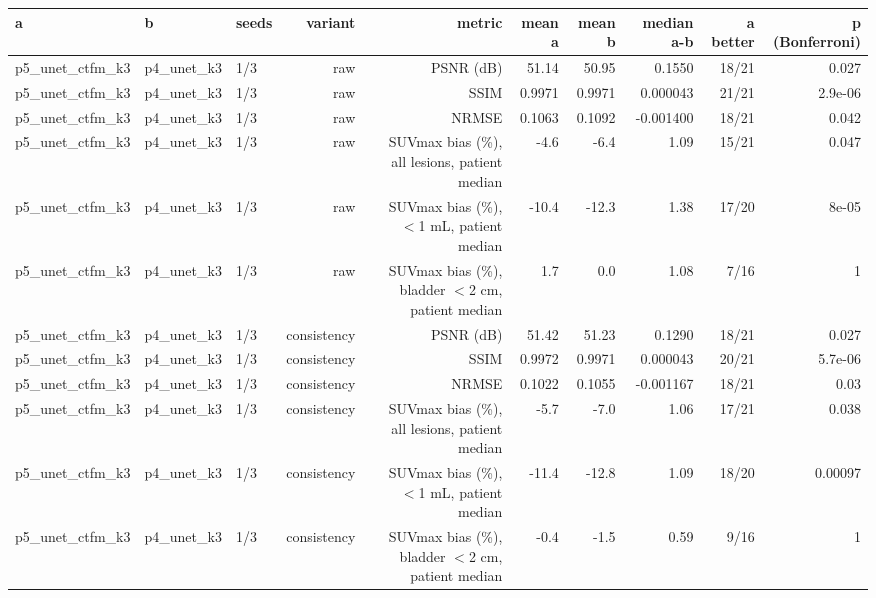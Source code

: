 \begin{tabular}{lllrrrrrrr}
\toprule
a & b & seeds & variant & metric & mean a & mean b & median a-b & a better & p (Bonferroni) \\
\midrule
p5\_unet\_ctfm\_k3 & p4\_unet\_k3 & 1/3 & raw & PSNR (dB) & 51.14 & 50.95 & 0.1550 & 18/21 & 0.027 \\
p5\_unet\_ctfm\_k3 & p4\_unet\_k3 & 1/3 & raw & SSIM & 0.9971 & 0.9971 & 0.000043 & 21/21 & 2.9e-06 \\
p5\_unet\_ctfm\_k3 & p4\_unet\_k3 & 1/3 & raw & NRMSE & 0.1063 & 0.1092 & -0.001400 & 18/21 & 0.042 \\
p5\_unet\_ctfm\_k3 & p4\_unet\_k3 & 1/3 & raw & SUVmax bias (\%), all lesions, patient median & -4.6 & -6.4 & 1.09 & 15/21 & 0.047 \\
p5\_unet\_ctfm\_k3 & p4\_unet\_k3 & 1/3 & raw & SUVmax bias (\%), $<$1 mL, patient median & -10.4 & -12.3 & 1.38 & 17/20 & 8e-05 \\
p5\_unet\_ctfm\_k3 & p4\_unet\_k3 & 1/3 & raw & SUVmax bias (\%), bladder $<$2 cm, patient median & 1.7 & 0.0 & 1.08 & 7/16 & 1 \\
p5\_unet\_ctfm\_k3 & p4\_unet\_k3 & 1/3 & consistency & PSNR (dB) & 51.42 & 51.23 & 0.1290 & 18/21 & 0.027 \\
p5\_unet\_ctfm\_k3 & p4\_unet\_k3 & 1/3 & consistency & SSIM & 0.9972 & 0.9971 & 0.000043 & 20/21 & 5.7e-06 \\
p5\_unet\_ctfm\_k3 & p4\_unet\_k3 & 1/3 & consistency & NRMSE & 0.1022 & 0.1055 & -0.001167 & 18/21 & 0.03 \\
p5\_unet\_ctfm\_k3 & p4\_unet\_k3 & 1/3 & consistency & SUVmax bias (\%), all lesions, patient median & -5.7 & -7.0 & 1.06 & 17/21 & 0.038 \\
p5\_unet\_ctfm\_k3 & p4\_unet\_k3 & 1/3 & consistency & SUVmax bias (\%), $<$1 mL, patient median & -11.4 & -12.8 & 1.09 & 18/20 & 0.00097 \\
p5\_unet\_ctfm\_k3 & p4\_unet\_k3 & 1/3 & consistency & SUVmax bias (\%), bladder $<$2 cm, patient median & -0.4 & -1.5 & 0.59 & 9/16 & 1 \\
\bottomrule
\end{tabular}
